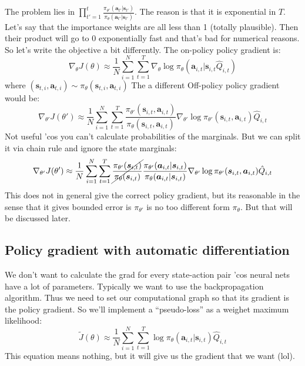 \documentclass{report}
\begin{document}
The problem lies in $\prod_{t'=1}^{t} \frac{\pi_{\theta'} (\bm{a}_{t'} | \bm{s}_{t'})}{\pi_\theta(\bm{a}_{t'} | \bm{s}_{t'})}$.
The reason is that it is exponential in $T$.
Let's say that the importance weights are all less than 1 (totally plausible).
Then their product will go to 0 exponentially fast and that's bad for numerical reasons.
So let's write the objective a bit differently.
The on-policy policy gradient is:
\begin{equation}
		\nabla_\theta J(\theta) \approx
		\frac{1}{N} \sum_{i=1}^{N} \sum_{t=1}^{T} \nabla_\theta \log \pi_\theta(\bm{a}_{i,t}|\bm{s}_{i,t} \hat{Q}_{i,t} )
\end{equation}
where $(\bm{s}_{t,i}, \bm{a}_{t,i}) \sim \pi_\theta(\bm{s}_{t,i}, \bm{a}_{t,i})$
The a different Off-policy policy gradient would be:
\begin{equation}
		\nabla_{\theta'} J(\theta') \approx
		\frac{1}{N} \sum_{i=1}^{N} \sum_{t=1}^{T} 
		\frac{\pi_{\theta'}(\bm{s}_{i,t}, \bm{a}_{i,t})}{\pi_{\theta}(\bm{s}_{i,t}, \bm{a}_{i,t})} 
		\nabla_{\theta'} \log \pi_{\theta'} (\bm{s}_{i,t}, \bm{a}_{i,t}) 
		\hat{Q}_{i,t} 
\end{equation}
Not useful 'cos you can't calculate probabilities of the marginals.
But we can split it via chain rule and ignore the state marginals:
\begin{equation}
		\nabla_{\theta'} J(\theta') \approx
		\frac{1}{N} \sum_{i=1}^{N} \sum_{t=1}^{T}
		\cancel{\frac{\pi_{\theta'}(\bm{s}_{i,t})}{\pi_{\theta}(\bm{s}_{i,t})}  }
		\frac{\pi_{\theta'}( \bm{a}_{i,t} | \bm{s}_{i,t})}{\pi_{\theta}( \bm{a}_{i,t} | \bm{s}_{i,t})} 
		\nabla_{\theta'} \log \pi_{\theta'} (\bm{s}_{i,t}, \bm{a}_{i,t}) 
		\hat{Q}_{i,t} 
\end{equation}
This does not in general give the correct policy gradient, but its reasonable
in the sense that it gives bounded error is $\pi_{\theta'}$ is no too different form $\pi_\theta$.
But that will be discussed later.

\subsection{Policy gradient with automatic differentiation}
We don't want to calculate the grad for every state-action pair 'cos neural nets have a lot of 
parameters.
Typically we want to use the backpropagation algorithm.
Thus we need to set our computational graph so that its gradient is the policy gradient.
So we'll implement a ``pseudo-loss'' as a weighet maximum likelihood:
\begin{equation}
		\tilde{J}(\theta) \approx \frac{1}{N} \sum_{i=1}^{N} \sum_{t=1}^{T} \log \pi_\theta(\bm{a}_{i,t} | \bm{s}_{i,t}) \hat{Q}_{i,t}
\end{equation}
This equation means nothing, but it will give us the gradient that we want (lol).
\end{document}
